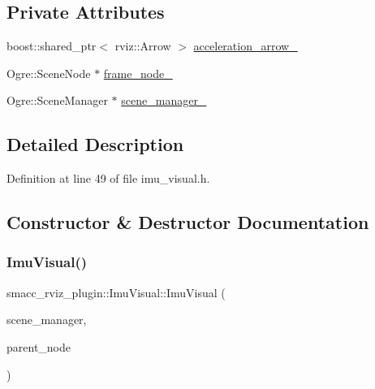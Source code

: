\subsection*{Private Attributes}
\begin{DoxyCompactItemize}
\item 
boost\+::shared\+\_\+ptr$<$ rviz\+::\+Arrow $>$ \hyperlink{classsmacc__rviz__plugin_1_1ImuVisual_abead7d3f3c66b20bba8123a145b121b0}{acceleration\+\_\+arrow\+\_\+}
\item 
Ogre\+::\+Scene\+Node $\ast$ \hyperlink{classsmacc__rviz__plugin_1_1ImuVisual_ae41316c00ac89e1e0ee0adf62da10841}{frame\+\_\+node\+\_\+}
\item 
Ogre\+::\+Scene\+Manager $\ast$ \hyperlink{classsmacc__rviz__plugin_1_1ImuVisual_acef4dba58d14224192bbed7eabbd6cbb}{scene\+\_\+manager\+\_\+}
\end{DoxyCompactItemize}


\subsection{Detailed Description}


Definition at line 49 of file imu\+\_\+visual.\+h.



\subsection{Constructor \& Destructor Documentation}
\mbox{\label{classsmacc__rviz__plugin_1_1ImuVisual_a3963b29a785b0b95e56ac860cb58b000}} 
\subsubsection{\texorpdfstring{Imu\+Visual()}{ImuVisual()}}
{\footnotesize\ttfamily smacc\+\_\+rviz\+\_\+plugin\+::\+Imu\+Visual\+::\+Imu\+Visual (\begin{DoxyParamCaption}\item[{Ogre\+::\+Scene\+Manager $\ast$}]{scene\+\_\+manager,  }\item[{Ogre\+::\+Scene\+Node $\ast$}]{parent\+\_\+node }\end{DoxyParamCaption})}



